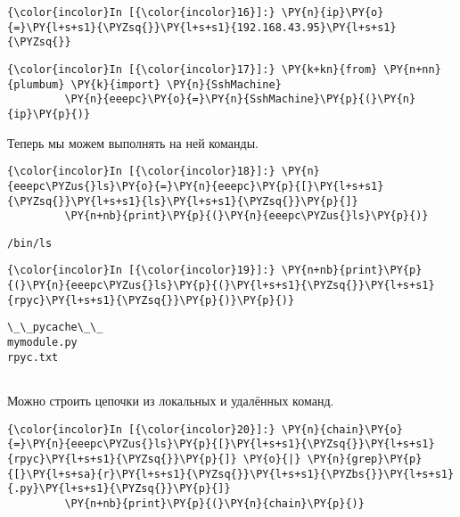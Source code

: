     \begin{Verbatim}[commandchars=\\\{\}]
{\color{incolor}In [{\color{incolor}16}]:} \PY{n}{ip}\PY{o}{=}\PY{l+s+s1}{\PYZsq{}}\PY{l+s+s1}{192.168.43.95}\PY{l+s+s1}{\PYZsq{}}
\end{Verbatim}


    \begin{Verbatim}[commandchars=\\\{\}]
{\color{incolor}In [{\color{incolor}17}]:} \PY{k+kn}{from} \PY{n+nn}{plumbum} \PY{k}{import} \PY{n}{SshMachine}
         \PY{n}{eeepc}\PY{o}{=}\PY{n}{SshMachine}\PY{p}{(}\PY{n}{ip}\PY{p}{)}
\end{Verbatim}


    Теперь мы можем выполнять на ней команды.

    \begin{Verbatim}[commandchars=\\\{\}]
{\color{incolor}In [{\color{incolor}18}]:} \PY{n}{eeepc\PYZus{}ls}\PY{o}{=}\PY{n}{eeepc}\PY{p}{[}\PY{l+s+s1}{\PYZsq{}}\PY{l+s+s1}{ls}\PY{l+s+s1}{\PYZsq{}}\PY{p}{]}
         \PY{n+nb}{print}\PY{p}{(}\PY{n}{eeepc\PYZus{}ls}\PY{p}{)}
\end{Verbatim}


    \begin{Verbatim}[commandchars=\\\{\}]
/bin/ls

    \end{Verbatim}

    \begin{Verbatim}[commandchars=\\\{\}]
{\color{incolor}In [{\color{incolor}19}]:} \PY{n+nb}{print}\PY{p}{(}\PY{n}{eeepc\PYZus{}ls}\PY{p}{(}\PY{l+s+s1}{\PYZsq{}}\PY{l+s+s1}{rpyc}\PY{l+s+s1}{\PYZsq{}}\PY{p}{)}\PY{p}{)}
\end{Verbatim}


    \begin{Verbatim}[commandchars=\\\{\}]
\_\_pycache\_\_
mymodule.py
rpyc.txt


    \end{Verbatim}

    Можно строить цепочки из локальных и удалённых команд.

    \begin{Verbatim}[commandchars=\\\{\}]
{\color{incolor}In [{\color{incolor}20}]:} \PY{n}{chain}\PY{o}{=}\PY{n}{eeepc\PYZus{}ls}\PY{p}{[}\PY{l+s+s1}{\PYZsq{}}\PY{l+s+s1}{rpyc}\PY{l+s+s1}{\PYZsq{}}\PY{p}{]} \PY{o}{|} \PY{n}{grep}\PY{p}{[}\PY{l+s+sa}{r}\PY{l+s+s1}{\PYZsq{}}\PY{l+s+s1}{\PYZbs{}}\PY{l+s+s1}{.py}\PY{l+s+s1}{\PYZsq{}}\PY{p}{]}
         \PY{n+nb}{print}\PY{p}{(}\PY{n}{chain}\PY{p}{)}
\end{Verbatim}



